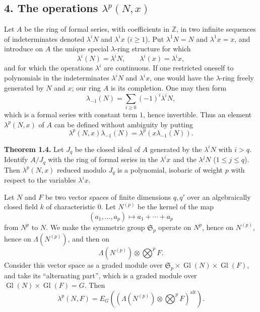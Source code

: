 \documentclass[11pt]{article}
\providecommand{\Z}{\mathbb Z}
\providecommand{\Gl}{\operatorname{Gl}}
\begin{document}
\subsection*{4. The operations $\lambda^p(N,x)$}

Let $A$ be the ring of formal series, with coefficients in $\Z$, in two infinite sequences of indeterminates denoted $\lambda^iN$ and $\lambda^i x$ ($i\geq 1$). Put $\lambda^1N=N$ and $\lambda^1x=x$, and introduce on $A$ the unique special $\lambda$-ring structure for which
\[
\lambda^i(N)=\lambda^iN,
\qquad
\lambda^i(x)=\lambda^i x,
\]
and for which the operations $\lambda^i$ are continuous. If one restricted oneself to polynomials in the indeterminates $\lambda^iN$ and $\lambda^i x$, one would have the $\lambda$-ring freely generated by $N$ and $x$; our ring $A$ is its completion. One may then form
\begin{equation}\tag{1.31}
\lambda_{-1}(N)=\sum_{i\geq 0}(-1)^i\lambda^iN,
\end{equation}
which is a formal series with constant term $1$, hence invertible. Thus an element $\lambda^p(N,x)$ of $A$ can be defined without ambiguity by putting
\begin{equation}\tag{1.32}
\lambda^p(N,x)\lambda_{-1}(N)=\lambda^p(x\lambda_{-1}(N)).
\end{equation}

\textbf{Theorem 1.4.} Let $J_q$ be the closed ideal of $A$ generated by the $\lambda^iN$ with $i>q$. Identify $A/J_q$ with the ring of formal series in the $\lambda^i x$ and the $\lambda^jN$ ($1\leq j\leq q$). Then $\lambda^p(N,x)$ reduced modulo $J_q$ is a polynomial, isobaric of weight $p$ with respect to the variables $\lambda^i x$.

Let $N$ and $F$ be two vector spaces of finite dimensions $q,q'$ over an algebraically closed field $k$ of characteristic $0$. Let $N^{(p)}$ be the kernel of the map
\[
(a_1,\ldots,a_p)\longmapsto a_1+\cdots+a_p
\]
from $N^p$ to $N$. We make the symmetric group $\mathfrak S_p$ operate on $N^p$, hence on $N^{(p)}$, hence on $\Lambda(N^{(p)})$, and then on
\[
\Lambda(N^{(p)})\otimes\bigotimes^p F.
\]
Consider this vector space as a graded module over $\mathfrak S_p\times\Gl(N)\times\Gl(F)$, and take its ``alternating part'', which is a graded module over $\Gl(N)\times\Gl(F)=G$. Then
\begin{equation}\tag{1.33}
\lambda^p(N,F)=E_G\left(\left(\Lambda(N^{(p)})\otimes\bigotimes^p F\right)^{\mathrm{alt}}\right).
\end{equation}
\end{document}
